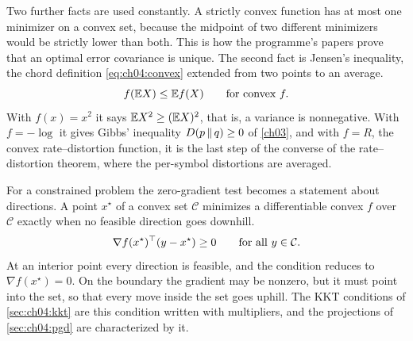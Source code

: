Two further facts are used constantly. A strictly convex function has at most one minimizer on a convex set, because the midpoint of two different minimizers would be strictly lower than both. This is how the programme's papers prove that an optimal error covariance is unique. The second fact is Jensen's inequality, the chord definition \eqref{eq:ch04:convex} extended from two points to an average.
\begin{equation}\label{eq:ch04:jensen}
f(\mathbb{E} X)\le\mathbb{E} f(X)\qquad\text{for convex }f .
\end{equation}
With $f(x)=x^2$ it says $\mathbb{E} X^2\ge(\mathbb{E} X)^2$, that is, a variance is nonnegative. With $f=-\log$ it gives Gibbs' inequality $D\!\left(p\,\middle\|\,q\right)\ge0$ of \cref{ch03}, and with $f=R$, the convex rate--distortion function, it is the last step of the converse of the rate--distortion theorem, where the per-symbol distortions are averaged.

For a constrained problem the zero-gradient test becomes a statement about directions. A point $x^\star$ of a convex set $\mathcal C$ minimizes a differentiable convex $f$ over $\mathcal C$ exactly when no feasible direction goes downhill.
\begin{equation}\label{eq:ch04:vi}
\nabla f(x^\star)^{\top}(y-x^\star)\ge0\qquad\text{for all }y\in\mathcal C .
\end{equation}
At an interior point every direction is feasible, and the condition reduces to $\nabla f(x^\star)=0$. On the boundary the gradient may be nonzero, but it must point into the set, so that every move inside the set goes uphill. The KKT conditions of \cref{sec:ch04:kkt} are this condition written with multipliers, and the projections of \cref{sec:ch04:pgd} are characterized by it.


